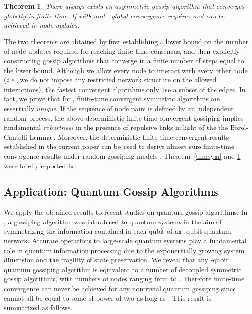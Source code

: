 \documentclass[a4paper, 11pt]{article}
\newtheorem{theorem}{Theorem}
\begin{document}
\medskip


\begin{theorem}\label{thasym}
There always exists an asymmetric gossip algorithm that converges globally in finite time. If   with  and  , global convergence requires and can be achieved in  node updates.
\end{theorem}


\medskip

The two theorems are obtained by first establishing a lower bound on the number of node updates required for reaching finite-time consensus, and then explicitly constructing gossip algorithms that converge in a finite number of steps equal to the lower bound. Although we allow every node to interact with every other node (\emph{i.e.}, we do not impose any restricted network structure on the allowed interactions), the  fastest convergent algorithms only use a subset of the edges. In fact, we  prove that for , finite-time convergent symmetric algorithms are essentially {\it unique}. If the sequence of node pairs  is defined by an independent random process, the above deterministic finite-time convergent gossiping implies fundamental {\it robustness}  in the presence of repulsive links in light of the the Borel-Cantelli Lemma \cite{Shi2013}. Moreover, the deterministic finite-time convergent results established in the current paper can be used to derive almost sure finite-time convergence results under random gossiping models \cite{Shi-TIT}. Theorem~\ref{thmsym} and \ref{thasym} were briefly  reported in \cite{MTNS}.

\subsection{Application: Quantum Gossip Algorithms}
We apply the obtained results to recent studies on quantum gossip algorithms. In \cite{Mazzarella2013a,Mazzarella2013b}, a gossiping algorithm was introduced to quantum systems in the aim of symmetrizing  the information contained in each qubit of an -qubit quantum network. Accurate operations to large-scale quantum systems play a fundamental role in quantum information processing due to the exponentially growing system dimension and the fragility of state preservation.  We reveal that any -qubit quantum gossiping algorithm is equivalent to a number of decoupled  symmetric gossip algorithms, with numbers of nodes ranging from  to . Therefore finite-time convergence can never be achieved for any nontrivial quantum gossiping  since   cannot all be equal to some of power of two as long as . This result is summarized as follows.
\end{document}
